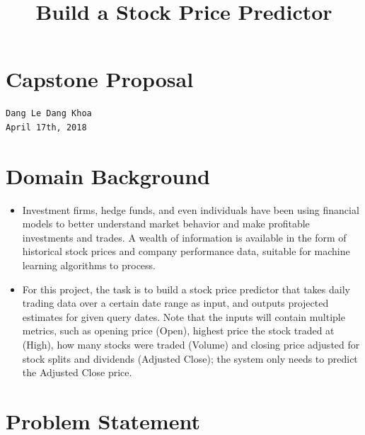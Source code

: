 \documentclass[11pt]{article}
\title{Build a Stock Price Predictor}
\begin{document}
    
    
    \maketitle
    
    

    
    \section{Capstone Proposal}\label{capstone-proposal}

\begin{verbatim}
Dang Le Dang Khoa
April 17th, 2018
\end{verbatim}

\section{Domain Background}\label{domain-background}

\begin{itemize}
\item
  Investment firms, hedge funds, and even individuals have been using
  financial models to better understand market behavior and make
  profitable investments and trades. A wealth of information is
  available in the form of historical stock prices and company
  performance data, suitable for machine learning algorithms to process.
\item
  For this project, the task is to build a stock price predictor that
  takes daily trading data over a certain date range as input, and
  outputs projected estimates for given query dates. Note that the
  inputs will contain multiple metrics, such as opening price (Open),
  highest price the stock traded at (High), how many stocks were traded
  (Volume) and closing price adjusted for stock splits and dividends
  (Adjusted Close); the system only needs to predict the Adjusted Close
  price.
\end{itemize}

\section{Problem Statement}\label{problem-statement}
\end{document}
